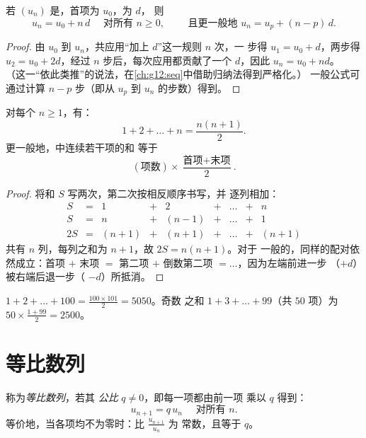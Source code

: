 \begin{theorem}[通项公式]\label{thm:g11:seq:arithgeneral}
若 $(u_n)$ 是，首项为 $u_0$，为 $d$，
则
\[
u_n = u_0 + n\,d \quad \text{ 对所有 } n \geq 0,
\qquad\text{ 且更一般地 } u_n = u_p + (n - p)\,d .
\]
\end{theorem}

\begin{proof}
由 $u_0$ 到 $u_n$，共应用“加上 $d$”这一规则 $n$ 次，一
步得 $u_1 = u_0 + d$，两步得 $u_2 = u_0 + 2d$，经过 $n$
步后，每次应用都贡献了一个 $d$，因此 $u_n = u_0 + nd$。
（这一“依此类推”的说法，在\cref{ch:g12:seq}中借助归纳法得到严格化。）
一般公式可通过计算 $n - p$ 步（即从 $u_p$ 到
$u_n$ 的步数）得到。
\end{proof}

\begin{theorem}[连续整数之和]\label{thm:g11:seq:intsum}
对每个 $n \geq 1$，有：
\[
1 + 2 + \dots + n = \frac{n(n+1)}{2}.
\]
更一般地，中连续若干项的和
等于
\[
(\text{项数}) \times
\frac{\text{首项} + \text{末项}}{2}.
\]
\end{theorem}

\begin{proof}
将和 $S$ 写两次，第二次按相反顺序书写，并
逐列相加：
\[
\begin{array}{ccccccccc}
S & = & 1 & + & 2 & + & \dots & + & n\\
S & = & n & + & (n-1) & + & \dots & + & 1\\
\hline
2S & = & (n+1) & + & (n+1) & + & \dots & + & (n+1)
\end{array}
\]
共有 $n$ 列，每列之和为 $n + 1$，故 $2S = n(n+1)$。对于
一般的，同样的配对依然成立：首项 $+$ 末项 $=$
第二项 $+$ 倒数第二项 $= \dots$，因为左端前进一步
（$+d$）被右端后退一步（
$-d$）所抵消。
\end{proof}

\begin{example}
$1 + 2 + \dots + 100 = \frac{100 \times 101}{2} = 5050$。奇数
之和 $1 + 3 + \dots + 99$（共 $50$ 项）为
$50 \times \frac{1 + 99}{2} = 2500$。
\end{example}

\section{等比数列}

\begin{definition}[等比数列]\label{def:g11:seq:geometric}
称为\emph{等比数列}，若其
\emph{公比} $q \neq 0$，即每一项都由前一项
乘以 $q$ 得到：
\[
u_{n+1} = q\,u_n \quad \text{ 对所有 } n.
\]
等价地，当各项均不为零时：比 $\frac{u_{n+1}}{u_n}$ 为
常数，且等于 $q$。
\end{definition}

